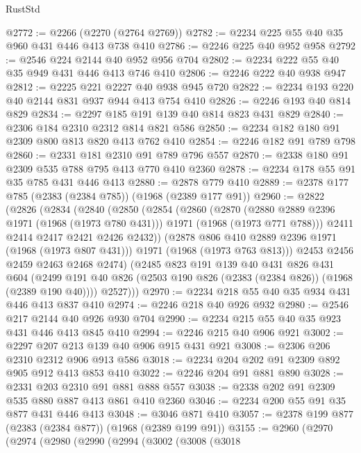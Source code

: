 \begin{lexlean}{RustStd}
\begin{coremodule}
@2772 := @2266 (@2270 (@2764 @2769))
@2782 := @2234 @225 @55 @40 @35 @960 @431 @446 @413 @738 @410
@2786 := @2246 @225 @40 @952 @958
@2792 := @2546 @224 @2144 @40 @952 @956 @704
@2802 := @2234 @222 @55 @40 @35 @949 @431 @446 @413 @746 @410
@2806 := @2246 @222 @40 @938 @947
@2812 := @2225 @221 @2227 @40 @938 @945 @720
@2822 := @2234 @193 @220 @40 @2144 @831 @937 @944 @413 @754 @410
@2826 := @2246 @193 @40 @814 @829
@2834 := @2297 @185 @191 @139 @40 @814 @823 @431 @829
@2840 := @2306 @184 @2310 @2312 @814 @821 @586
@2850 := @2234 @182 @180 @91 @2309 @800 @813 @820 @413 @762 @410
@2854 := @2246 @182 @91 @789 @798
@2860 := @2331 @181 @2310 @91 @789 @796 @557
@2870 := @2338 @180 @91 @2309 @535 @788 @795 @413 @770 @410 @2360
@2878 := @2234 @178 @55 @91 @35 @785 @431 @446 @413
@2880 := @2878 @779 @410
@2889 := @2378 @177 @785 (@2383 (@2384 @785)) (@1968 (@2389 @177 @91))
@2960 := @2822
    (@2826
      (@2834
        (@2840
          (@2850
            (@2854
              (@2860
                (@2870
                  (@2880 @2889 @2396 @1971 (@1968 (@1973 @780 @431)))
                  @1971
                  (@1968 (@1973 @771 @788)))
                @2411
                @2414
                @2417
                @2421
                @2426
                @2432))
            (@2878 @806 @410 @2889 @2396 @1971 (@1968 (@1973 @807 @431)))
            @1971
            (@1968 (@1973 @763 @813)))
          @2453
          @2456
          @2459
          @2463
          @2468
          @2474)
        (@2485
          @823
          @191
          @139
          @40
          @431
          @826
          @431
          @604
          (@2499 @191 @40 @826 (@2503 @190 @826 (@2383 (@2384 @826)) (@1968 (@2389 @190 @40))))
          @2527)))
@2970 := @2234 @218 @55 @40 @35 @934 @431 @446 @413 @837 @410
@2974 := @2246 @218 @40 @926 @932
@2980 := @2546 @217 @2144 @40 @926 @930 @704
@2990 := @2234 @215 @55 @40 @35 @923 @431 @446 @413 @845 @410
@2994 := @2246 @215 @40 @906 @921
@3002 := @2297 @207 @213 @139 @40 @906 @915 @431 @921
@3008 := @2306 @206 @2310 @2312 @906 @913 @586
@3018 := @2234 @204 @202 @91 @2309 @892 @905 @912 @413 @853 @410
@3022 := @2246 @204 @91 @881 @890
@3028 := @2331 @203 @2310 @91 @881 @888 @557
@3038 := @2338 @202 @91 @2309 @535 @880 @887 @413 @861 @410 @2360
@3046 := @2234 @200 @55 @91 @35 @877 @431 @446 @413
@3048 := @3046 @871 @410
@3057 := @2378 @199 @877 (@2383 (@2384 @877)) (@1968 (@2389 @199 @91))
@3155 := @2960
    (@2970
      (@2974
        (@2980
          (@2990
            (@2994
              (@3002
                (@3008
                  (@3018

\end{coremodule}
\end{lexlean}
